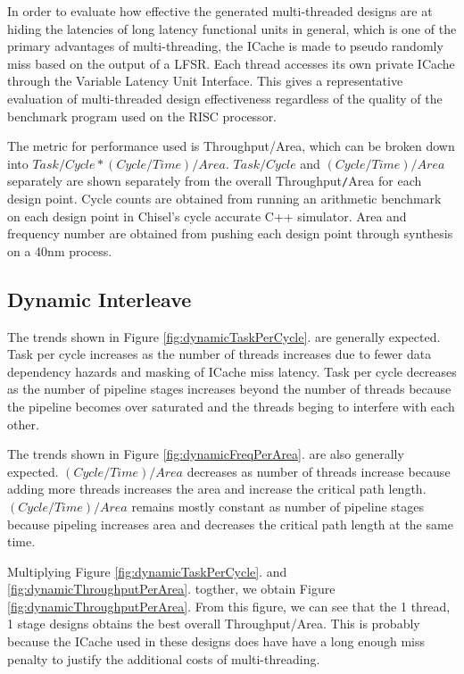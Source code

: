 In order to evaluate how effective the generated multi-threaded designs are at hiding the latencies of long latency functional units in general, which is one of the primary advantages of multi-threading, the ICache is made to pseudo randomly miss based on the output of a LFSR. Each thread accesses its own private ICache through the Variable Latency Unit Interface. This gives a representative evaluation of multi-threaded design effectiveness regardless of the quality of the benchmark program used on the RISC processor.

The metric for performance used is Throughput/Area, which can be broken down into $Task/Cycle * (Cycle/Time)/Area$. $Task/Cycle$ and $(Cycle/Time)/Area$ separately are shown separately from the overall Throughput{\tt /}Area for each design point. Cycle counts are obtained from running an arithmetic benchmark on each design point in Chisel's cycle accurate C++ simulator. Area and frequency number are obtained from pushing each design point through synthesis on a 40nm process.

\subsection{Dynamic Interleave}
The trends shown in Figure \ref{fig:dynamicTaskPerCycle}. are generally expected. Task per cycle increases as the number of threads increases due to fewer data dependency hazards and masking of ICache miss latency. Task per cycle decreases as the number of pipeline stages increases beyond the number of threads because the pipeline becomes over saturated and the threads beging to interfere with each other.

The trends shown in Figure \ref{fig:dynamicFreqPerArea}. are also generally expected. $(Cycle/Time)/Area$ decreases as number of threads increase because adding more threads increases the area and increase the critical path length. $(Cycle/Time)/Area$ remains mostly constant as number of pipeline stages because pipeling increases area and decreases the critical path length at the same time.

Multiplying Figure \ref{fig:dynamicTaskPerCycle}. and \ref{fig:dynamicThroughputPerArea}. togther, we obtain Figure \ref{fig:dynamicThroughputPerArea}. From this figure, we can see that the 1 thread, 1 stage designs obtains the best overall Throughput/Area. This is probably because the ICache used in these designs does have have a long enough miss penalty to justify the additional costs of multi-threading.

